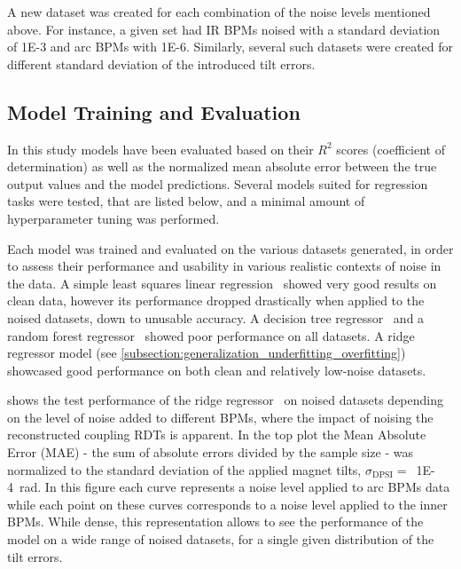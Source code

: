 A new dataset was created for each combination of the noise levels mentioned above.
For instance, a given set had IR BPMs noised with a standard deviation of \num{1E-3} and arc BPMs with \num{1E-6}.
Similarly, several such datasets were created for different standard deviation of the introduced tilt errors.

\subsection{Model Training and Evaluation}

In this study models have been evaluated based on their \(R^2\) scores (coefficient of determination) as well as the normalized mean absolute error between the true output values and the model predictions.
Several models suited for regression tasks were tested, that are listed below, and a minimal amount of hyperparameter tuning was performed.

Each model was trained and evaluated on the various datasets generated, in order to assess their performance and usability in various realistic contexts of noise in the data. 
A simple least squares linear regression~\cite{PNAS:Lai:Strong_Consistency_Least_Squares_Estimates_Regression_Models} showed very good results on clean data, however its performance dropped drastically when applied to the noised datasets, down to unusable accuracy.
A decision tree regressor~\cite{BOOK:Breiman:Classification_Regression_Trees} and a random forest regressor~\cite{ML:Breiman:Random_Forests} showed poor performance on all datasets.
A ridge regressor model (see \cref{subsection:generalization_underfitting_overfitting}) showcased good performance on both clean and relatively low-noise datasets.

 shows the test performance of the ridge regressor~\cite{MIT:Rifkin:Regularized_Least_Squares} on noised datasets depending on the level of noise added to different BPMs, where the impact of noising the reconstructed coupling RDTs is apparent.
In the top plot the Mean Absolute Error (MAE) - the sum of absolute errors divided by the sample size - was normalized to the standard deviation of the applied magnet tilts, \(\sigma_{\mathrm{DPSI}} =\)~\qty{1E-4}{\radian}.
In this figure each curve represents a noise level applied to arc BPMs data while each point on these curves corresponds to a noise level applied to the inner BPMs.
While dense, this representation allows to see the performance of the model on a wide range of noised datasets, for a single given distribution of the tilt errors.

